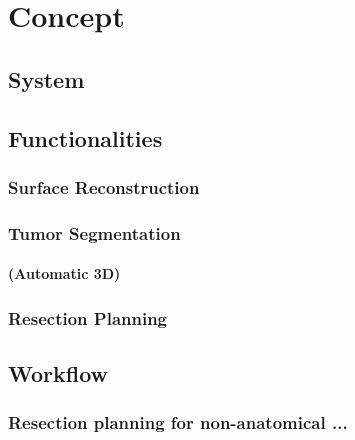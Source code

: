 \chapter{Concept}
\section{System}
\section{Functionalities}
\subsection{Surface Reconstruction}
\subsection{Tumor Segmentation}
\subsubsection{(Automatic 3D)}
\subsection{Resection Planning}
\section{Workflow}
\subsection{Resection planning for non-anatomical ...}


